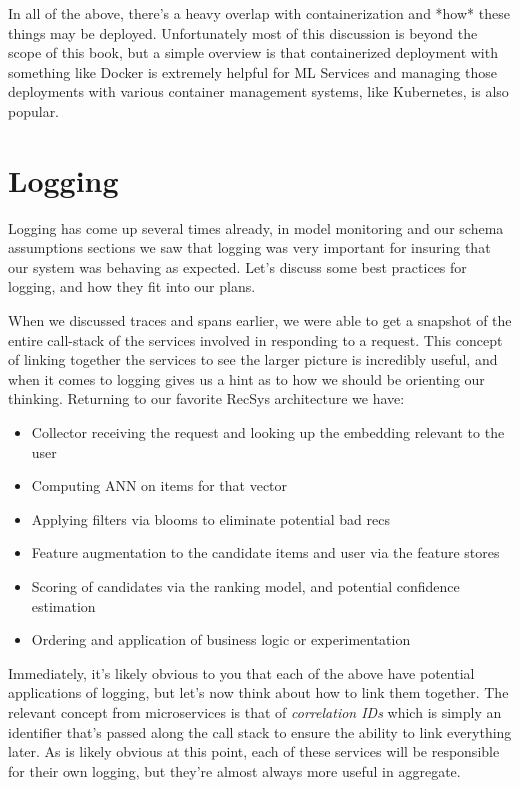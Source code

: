 In all of the above, there's a heavy overlap with containerization and *how* these things may be deployed. Unfortunately most of this discussion is beyond the scope of this book, but a simple overview is that containerized deployment with something like Docker is extremely helpful for ML Services and managing those deployments with various container management systems, like Kubernetes, is also popular.

\section{Logging}

Logging has come up several times already, in model monitoring and our schema assumptions sections we saw that logging was very important for insuring that our system was behaving as expected. Let's discuss some best practices for logging, and how they fit into our plans.

When we discussed traces and spans earlier, we were able to get a snapshot of the entire call-stack of the services involved in responding to a request. This concept of linking together the services to see the larger picture is incredibly useful, and when it comes to logging gives us a hint as to how we should be orienting our thinking. Returning to our favorite RecSys architecture we have:

\begin{itemize}
\item Collector receiving the request and looking up the embedding relevant to the user
\item Computing ANN on items for that vector
\item Applying filters via blooms to eliminate potential bad recs
\item Feature augmentation to the candidate items and user via the feature stores
\item Scoring of candidates via the ranking model, and potential confidence estimation
\item Ordering and application of business logic or experimentation
\end{itemize}

Immediately, it's likely obvious to you that each of the above have potential applications of logging, but let's now think about how to link them together. The relevant concept from microservices is that of \emph{correlation IDs} which is simply an identifier that's passed along the call stack to ensure the ability to link everything later. As is likely obvious at this point, each of these services will be responsible for their own logging, but they're almost always more useful in aggregate.


